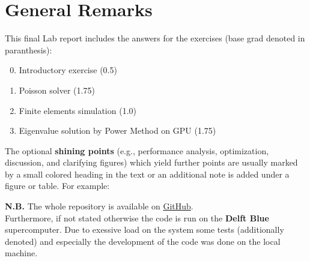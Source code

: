 \section*{General Remarks}
This final Lab report includes the answers for the exercises (base grad denoted in paranthesis):
\begin{enumerate}
    \setcounter{enumi}{-1}
    \item Introductory exercise (0.5)
    \item Poisson solver (1.75)
    \item Finite elements simulation (1.0)
    \item Eigenvalue solution by Power Method on GPU (1.75)
\end{enumerate}
The optional \textbf{shining points} (e.g., performance analysis, optimization, discussion, and
clarifying figures) which yield further points are usually marked by a small colored heading in the text or an additional note is added under a figure or table. For example:\\ 

\textbf{N.B.} The whole repository is available on \href{https://github.com/etschgi1/HPC}{GitHub}.\\
Furthermore, if not stated otherwise the code is run on the \textbf{Delft Blue} supercomputer. Due to exessive load on the system some tests (additionally denoted) and especially the development of the code was done on the local machine. 